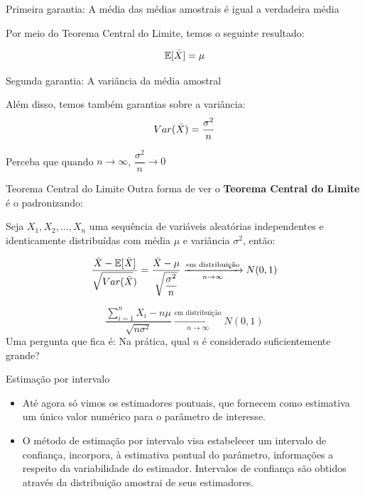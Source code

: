 \begin{frame}{Primeira garantia: A média das médias amostrais é igual a verdadeira média}

    Por meio do Teorema Central do Limite, temos o seguinte resultado:

    $$\mathbb{E}[\Bar{X}] = \mu $$
\end{frame}

\begin{frame}{Segunda garantia: A variância da média amostral}

    Além disso, temos também garantias sobre a variância:
    $$Var(\Bar{X}) = \dfrac{\sigma^2}{n}$$

   \pause

   Perceba que quando $n\to \infty$, $\dfrac{\sigma^2}{n} \to 0$
\end{frame}

\begin{frame}{Teorema Central do Limite}
    Outra forma de ver o \textbf{Teorema Central do Limite} é o padronizando:

     Seja $X_1, X_2, \dots, X_n$ uma sequência de variáveis aleatórias independentes e identicamente distribuídas com média $\mu$ e variância $\sigma^2$, então:

    $$\dfrac{\Bar{X} - \mathbb{E}[\Bar{X}]}{\sqrt{Var(\Bar{X}})} = \dfrac{\Bar{X} - \mu}{\sqrt{\dfrac{\sigma^2}{n}}} \xrightarrow[n \to \infty ]{\text{em distribuição}} N(0,1)$$

    $$\dfrac{\sum_{i=1}^n X_i - n\mu}{\sqrt{n\sigma^2}}  \xrightarrow[n \to \infty ]{\text{em distribuição}} N(0,1)$$
    \pause
    Uma pergunta que fica é: Na prática, qual $n$ é considerado suficientemente grande?
\end{frame}


\begin{frame}{Estimação por intervalo}

\begin{itemize}
    \item Até agora só vimos os estimadores pontuais, que fornecem como estimativa um único valor numérico para o parâmetro de interesse. 
    \item  O método de estimação por intervalo visa estabelecer um intervalo de confiança, incorpora, à estimativa pontual do parâmetro,
informações a respeito da variabilidade do estimador. Intervalos de confiança são
obtidos através da distribuição amostrai de seus estimadores.
\end{itemize}
    
\end{frame}

